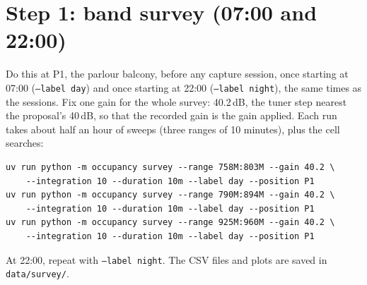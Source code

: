 \documentclass[11pt,a4paper]{article}
\newcommand{\cmd}[1]{\texttt{#1}}
\begin{document}
\section{Step 1: band survey (07:00 and 22:00)}
Do this at P1, the parlour balcony, before any capture session, once starting at 07:00 (\cmd{--label day}) and once starting at 22:00 (\cmd{--label night}), the same times as the sessions. Fix one gain for the whole survey: 40.2\,dB, the tuner step nearest the proposal's 40\,dB, so that the recorded gain is the gain applied. Each run takes about half an hour of sweeps (three ranges of 10 minutes), plus the cell searches:
\begin{Verbatim}
uv run python -m occupancy survey --range 758M:803M --gain 40.2 \
    --integration 10 --duration 10m --label day --position P1
uv run python -m occupancy survey --range 790M:894M --gain 40.2 \
    --integration 10 --duration 10m --label day --position P1
uv run python -m occupancy survey --range 925M:960M --gain 40.2 \
    --integration 10 --duration 10m --label day --position P1
\end{Verbatim}
At 22:00, repeat with \cmd{--label night}. The CSV files and plots are saved in \cmd{data/survey/}.
\end{document}
